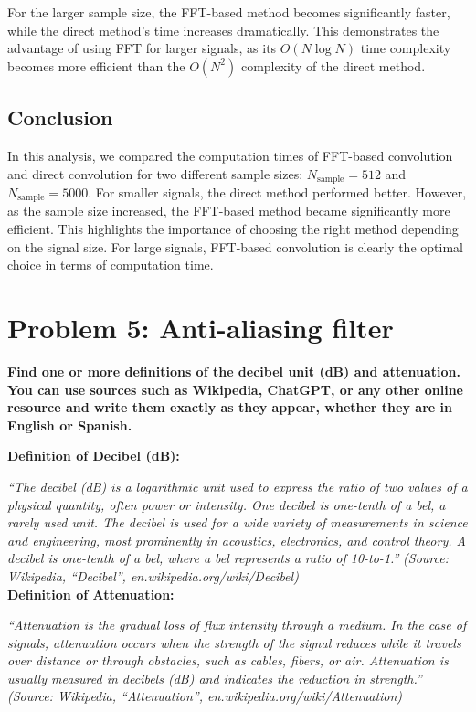 \documentclass[10pt]{article}
\theoremstyle{definition}
\theoremstyle{remark}
\theoremstyle{definition}
\numberwithin{equation}{prob}
\begin{document}
For the larger sample size, the FFT-based method becomes significantly faster, while the direct method's time increases dramatically. This demonstrates the advantage of using FFT for larger signals, as its \(O(N \log N)\) time complexity becomes more efficient than the \(O(N^2)\) complexity of the direct method.


\subsection{Conclusion}

In this analysis, we compared the computation times of FFT-based convolution and direct convolution for two different sample sizes: \(N_{\text{sample}} = 512\) and \(N_{\text{sample}} = 5000\). For smaller signals, the direct method performed better. However, as the sample size increased, the FFT-based method became significantly more efficient. This highlights the importance of choosing the right method depending on the signal size. For large signals, FFT-based convolution is clearly the optimal choice in terms of computation time.

\section{Problem 5: Anti-aliasing filter}

\textbf{Find one or more definitions of the decibel unit (dB) and attenuation. You can use sources such as Wikipedia, ChatGPT, or any other online resource and write them exactly as they appear, whether they are in English or Spanish.}

\textbf{Definition of Decibel (dB):}

\textit{``The decibel (dB) is a logarithmic unit used to express the ratio of two values of a physical quantity, often power or intensity. One decibel is one-tenth of a bel, a rarely used unit. The decibel is used for a wide variety of measurements in science and engineering, most prominently in acoustics, electronics, and control theory. A decibel is one-tenth of a bel, where a bel represents a ratio of 10-to-1.''}
\textit{(Source: Wikipedia, ``Decibel'', en.wikipedia.org/wiki/Decibel)}\\

\textbf{Definition of Attenuation:}

\textit{``Attenuation is the gradual loss of flux intensity through a medium. In the case of signals, attenuation occurs when the strength of the signal reduces while it travels over distance or through obstacles, such as cables, fibers, or air. Attenuation is usually measured in decibels (dB) and indicates the reduction in strength.''}
\textit{(Source: Wikipedia, ``Attenuation'', en.wikipedia.org/wiki/Attenuation)}\\
\end{document}
